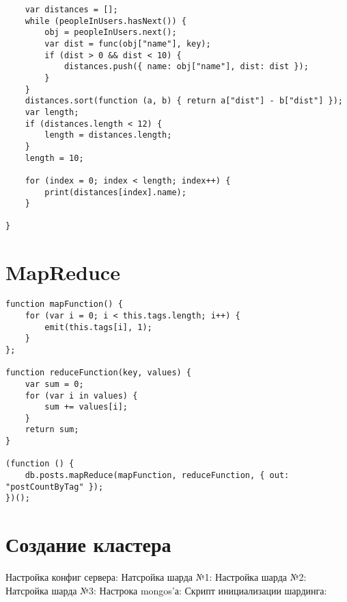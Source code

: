 \documentclass[a4paper]{article}
\begin{document}
\begin{verbatim}
    var distances = [];
    while (peopleInUsers.hasNext()) {
        obj = peopleInUsers.next();
        var dist = func(obj["name"], key);
        if (dist > 0 && dist < 10) {
            distances.push({ name: obj["name"], dist: dist });
        }
    }
    distances.sort(function (a, b) { return a["dist"] - b["dist"] });
    var length;
    if (distances.length < 12) {
        length = distances.length;
    }
    length = 10;

    for (index = 0; index < length; index++) {
        print(distances[index].name);
    }

}
\end{verbatim}
\section{MapReduce}
\begin{verbatim}
function mapFunction() {
    for (var i = 0; i < this.tags.length; i++) {
        emit(this.tags[i], 1);
    }
};

function reduceFunction(key, values) {
    var sum = 0;
    for (var i in values) {
        sum += values[i];
    }
    return sum;
}

(function () {
    db.posts.mapReduce(mapFunction, reduceFunction, { out: "postCountByTag" });
})();
\end{verbatim}
\section{Создание кластера}
Настройка конфиг сервера:
Натсройка шарда №1:
Настройка шарда №2:
Натсройка шарда №3:
Настрока mongos'а:
Скрипт инициализации шардинга:
\end{document}
